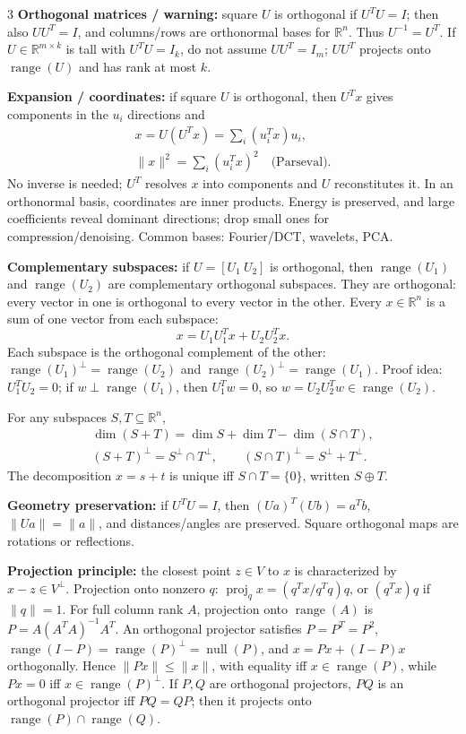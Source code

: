 \documentclass[10pt]{article}
\newcommand{\sub}[1]{\textbf{#1}}
\newcommand{\R}{\mathbb{R}}
\newcommand{\range}{\operatorname{range}}
\newcommand{\nullsp}{\operatorname{null}}
\newcommand{\proj}{\operatorname{proj}}
\begin{document}
\begin{multicols*}{3}
\sub{Orthogonal matrices / warning:} square \(U\) is orthogonal if
\(U^TU=I\); then also \(UU^T=I\), and columns/rows are orthonormal bases
for \(\R^n\). Thus \(U^{-1}=U^T\). If \(U\in\R^{m\times k}\) is tall
with \(U^TU=I_k\), do not assume \(UU^T=I_m\); \(UU^T\) projects onto
\(\range(U)\) and has rank at most \(k\).

\sub{Expansion / coordinates:} if square \(U\) is orthogonal, then
\(U^Tx\) gives components in the \(u_i\) directions and
\[
\begin{gathered}
x=U(U^Tx)=\sum_i(u_i^Tx)u_i,\\
\|x\|^2=\sum_i(u_i^Tx)^2 \quad \text{(Parseval)}.
\end{gathered}
\]
No inverse is needed; \(U^T\) resolves \(x\) into components and \(U\)
reconstitutes it. In an orthonormal basis, coordinates are inner
products. Energy is preserved, and large coefficients reveal dominant
directions; drop small ones for compression/denoising. Common bases:
Fourier/DCT, wavelets, PCA.

\sub{Complementary subspaces:} if \(U=[U_1\ U_2]\) is orthogonal, then
\(\range(U_1)\) and \(\range(U_2)\) are complementary orthogonal
subspaces. They are orthogonal: every vector in one is orthogonal to
every vector in the other. Every \(x\in\R^n\) is a sum of one vector from
each subspace:
\[
x=U_1U_1^Tx+U_2U_2^Tx.
\]
Each subspace is the orthogonal complement of the other:
\(\range(U_1)^\perp=\range(U_2)\) and
\(\range(U_2)^\perp=\range(U_1)\). Proof idea: \(U_1^TU_2=0\); if
\(w\perp\range(U_1)\), then \(U_1^Tw=0\), so
\(w=U_2U_2^Tw\in\range(U_2)\).

For any subspaces \(S,T\subseteq\R^n\),
\[
\begin{gathered}
\dim(S+T)=\dim S+\dim T-\dim(S\cap T),\\
(S+T)^\perp=S^\perp\cap T^\perp,\qquad
(S\cap T)^\perp=S^\perp+T^\perp.
\end{gathered}
\]
The decomposition \(x=s+t\) is unique iff \(S\cap T=\{0\}\), written
\(S\oplus T\).

\sub{Geometry preservation:} if \(U^TU=I\), then
\((Ua)^T(Ub)=a^Tb\), \(\|Ua\|=\|a\|\), and distances/angles are
preserved. Square orthogonal maps are rotations or reflections.

\sub{Projection principle:} the closest point \(z\in V\) to \(x\) is
characterized by \(x-z\in V^\perp\). Projection onto nonzero \(q\):
\(\proj_qx=(q^Tx/q^Tq)q\), or \((q^Tx)q\) if \(\|q\|=1\). For full
column rank \(A\), projection onto \(\range(A)\) is
\(P=A(A^TA)^{-1}A^T\). An orthogonal projector satisfies
\(P=P^T=P^2\), \(\range(I-P)=\range(P)^\perp=\nullsp(P)\), and
\(x=Px+(I-P)x\) orthogonally. Hence \(\|Px\|\le\|x\|\), with equality iff
\(x\in\range(P)\), while \(Px=0\) iff \(x\in\range(P)^\perp\). If \(P,Q\)
are orthogonal projectors, \(PQ\) is an orthogonal projector iff
\(PQ=QP\); then it projects onto \(\range(P)\cap\range(Q)\).


\end{multicols*}
\end{document}
